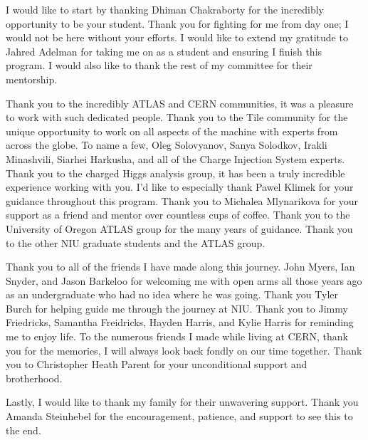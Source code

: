 I would like to start by thanking Dhiman Chakraborty for the incredibly opportunity to be your student. Thank you for fighting for me from day one; I would not be here without your efforts. I would like to extend my gratitude to Jahred Adelman for taking me on as a student and ensuring I finish this program. I would also like to thank the rest of my committee for their mentorship. 

Thank you to the incredibly ATLAS and CERN communities, it was a pleasure to work with such dedicated people. Thank you to the Tile community for the unique opportunity to work on all aspects of the machine with experts from across the globe. To name a few, Oleg Solovyanov, Sanya Solodkov, Irakli Minashvili, Siarhei Harkusha, and all of the Charge Injection System experts. Thank you to the charged Higgs analysis group, it has been a truly incredible experience working with you. I'd like to especially thank Pawel Klimek for your guidance throughout this program. Thank you to Michalea Mlynarikova for your support as a friend and mentor over countless cups of coffee. Thank you to the University of Oregon ATLAS group for the many years of guidance. Thank you to the other NIU graduate students and the ATLAS group.

Thank you to all of the friends I have made along this journey. John Myers, Ian Snyder, and Jason Barkeloo for welcoming me with open arms all those years ago as an undergraduate who had no idea where he was going. Thank you Tyler Burch for helping guide me through the journey at NIU. Thank you to Jimmy Friedricks, Samantha Freidricks, Hayden Harris, and Kylie Harris for reminding me to enjoy life. To the numerous friends I made while living at CERN, thank you for the memories, I will always look back fondly on our time together. Thank you to Christopher Heath Parent for your unconditional support and brotherhood.

Lastly, I would like to thank my family for their unwavering support. Thank you Amanda Steinhebel for the encouragement, patience, and support to see this to the end.
